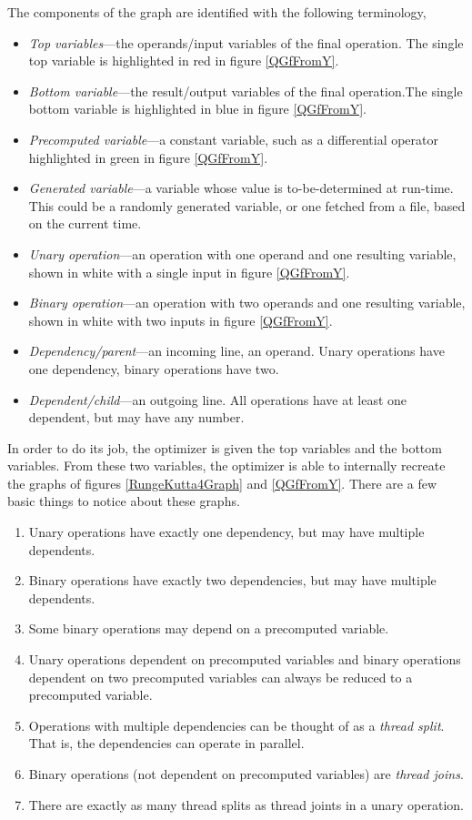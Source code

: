 \documentclass[11pt]{article}
\begin{document}
The components of the graph are identified with the following terminology,
\begin{itemize}
\item \emph{Top variables}---the operands/input variables of the final operation. The single top variable is highlighted in red in figure \ref{QGfFromY}.
\item \emph{Bottom variable}---the result/output variables of the final operation.The single bottom variable is highlighted in blue in figure \ref{QGfFromY}.
\item \emph{Precomputed variable}---a constant variable, such as a differential operator highlighted in green in figure \ref{QGfFromY}.
\item \emph{Generated variable}---a variable whose value is to-be-determined at run-time. This could be a randomly generated variable, or one fetched from a file, based on the current time.
\item \emph{Unary operation}---an operation with one operand and one resulting variable, shown in white with a single input in figure \ref{QGfFromY}.
\item \emph{Binary operation}---an operation with two operands and one resulting variable, shown in white with two inputs in figure \ref{QGfFromY}.
\item \emph{Dependency/parent}---an incoming line, an operand. Unary operations have one dependency, binary operations have two.
\item \emph{Dependent/child}---an outgoing line. All operations have at least one dependent, but may have any number.
\end{itemize}

In order to do its job, the optimizer is given the top variables and the bottom variables. From these two variables, the optimizer is able to internally recreate the graphs of figures \ref{RungeKutta4Graph} and \ref{QGfFromY}. There are a few basic things to notice about these graphs.

\begin{enumerate}
\item Unary operations have exactly one dependency, but may have multiple dependents.
\item Binary operations have exactly two dependencies, but may have multiple dependents.
\item Some binary operations may depend on a precomputed variable.
\item Unary operations dependent on precomputed variables and binary operations dependent on two precomputed variables can always be reduced to a precomputed variable.
\item Operations with multiple dependencies can be thought of as a \emph{thread split}. That is, the dependencies can operate in parallel.
\item Binary operations (not dependent on precomputed variables) are \emph{thread joins}.
\item There are exactly as many thread splits as thread joints in a unary operation.
\end{enumerate}
\end{document}
